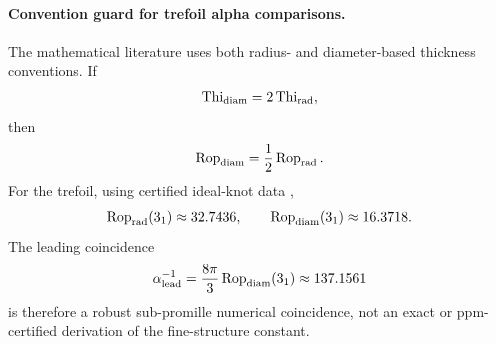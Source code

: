 \documentclass[11pt]{article}
\theoremstyle{definition}
\theoremstyle{plain}
\theoremstyle{remark}
\begin{document}
        \paragraph{Convention guard for trefoil alpha comparisons.}
        The mathematical literature uses both radius- and diameter-based thickness
        conventions.  If
        \begin{align}
            \operatorname{Thi}_{\rm diam}=2\operatorname{Thi}_{\rm rad},
        \end{align}
        then
        \begin{align}
            \operatorname{Rop}_{\rm diam}
            =
            \frac12\operatorname{Rop}_{\rm rad}.
        \end{align}
        For the trefoil, using certified ideal-knot data
        \cite{AshtonCantarellaPiatekRawdon2011},
        \begin{align}
            \operatorname{Rop}_{\rm rad}(3_1)\approx32.7436,
            \qquad
            \operatorname{Rop}_{\rm diam}(3_1)\approx16.3718 .
        \end{align}
        The leading coincidence
        \begin{align}
            \alpha^{-1}_{\rm lead}
            =
            \frac{8\pi}{3}\operatorname{Rop}_{\rm diam}(3_1)
            \approx
            137.1561
        \end{align}
        is therefore a robust sub-promille numerical coincidence, not an exact
        or ppm-certified derivation of the fine-structure constant.
\end{document}
